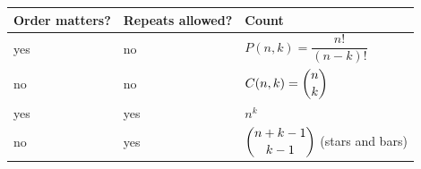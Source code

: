 \begin{keybox}
\begin{center}
\begin{tabular}{lll}
\toprule
\textbf{Order matters?} & \textbf{Repeats allowed?} & \textbf{Count} \\
\midrule
yes & no  & $P(n,k) = \dfrac{n!}{(n-k)!}$ \\[2em]
no  & no  & $C(n,k) = \dbinom{n}{k}$ \\[2em]
yes & yes & $n^k$ \\[2em]
no  & yes & $\dbinom{n+k-1}{k-1}$ \; (stars and bars) \\[0.5em]
\bottomrule
\end{tabular}
\end{center}
\end{keybox}
